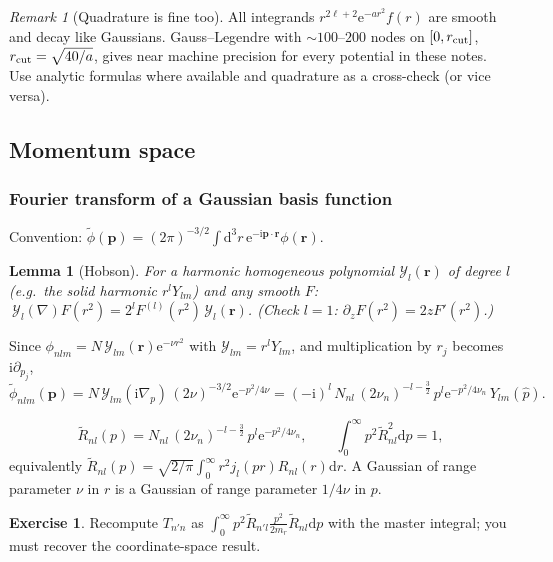 \documentclass[11pt,a4paper]{article}
\numberwithin{equation}{section}
\theoremstyle{definition}
\newtheorem{exercise}[definition]{Exercise}
\theoremstyle{plain}
\newtheorem{lemma}[definition]{Lemma}
\theoremstyle{remark}
\newtheorem{remark}[definition]{Remark}
\newenvironment{keyresult}[1][Key result]{\begin{tcolorbox}[keybox,title={\small\bfseries #1},fonttitle=\small,coltitle=white,colbacktitle=MidnightBlue!70]}{\end{tcolorbox}}
\numberwithin{algorithm}{section}
\newcommand{\vr}{\bm r}
\newcommand{\vp}{\bm p}
\newcommand{\dd}{\mathrm{d}}
\newcommand{\ii}{\mathrm{i}}
\newcommand{\ee}{\mathrm{e}}
\newcommand{\mr}{m_r}
\begin{document}
\begin{remark}[Quadrature is fine too]
All integrands $r^{2\ell+2}\ee^{-ar^2}f(r)$ are smooth and decay like Gaussians. Gauss--Legendre with $\sim100$--$200$ nodes on $[0,r_{\rm cut}]$, $r_{\rm cut}=\sqrt{40/a}$, gives near machine precision for every potential in these notes. Use analytic formulas where available and quadrature as a cross-check (or vice versa).
\end{remark}

\subsection{Momentum space}\label{sec:mom}
\subsubsection{Fourier transform of a Gaussian basis function}
Convention: $\tilde\phi(\vp)=(2\pi)^{-3/2}\int\dd^3r\,\ee^{-\ii\vp\cdot\vr}\phi(\vr)$.
\begin{lemma}[Hobson]
For a harmonic homogeneous polynomial $\mathcal Y_l(\vr)$ of degree $l$ (e.g.\ the solid harmonic $r^lY_{lm}$) and any smooth $F$: $\ \mathcal Y_l(\nabla)F(r^2)=2^lF^{(l)}(r^2)\,\mathcal Y_l(\vr)$. (Check $l=1$: $\partial_zF(r^2)=2zF'(r^2)$.)
\end{lemma}
Since $\phi_{nlm}=N\,\mathcal Y_{lm}(\vr)\ee^{-\nu r^2}$ with $\mathcal Y_{lm}=r^lY_{lm}$, and multiplication by $r_j$ becomes $\ii\partial_{p_j}$,
\begin{equation}
\tilde\phi_{nlm}(\vp)=N\,\mathcal Y_{lm}(\ii\nabla_p)\,(2\nu)^{-3/2}\ee^{-p^2/4\nu}=(-\ii)^l\,N_{nl}\,(2\nu_n)^{-l-\frac32}\,p^l\ee^{-p^2/4\nu_n}\,Y_{lm}(\hat p).
\end{equation}
\begin{keyresult}[Momentum-space radial basis]
\begin{equation}
\tilde R_{nl}(p)=N_{nl}\,(2\nu_n)^{-l-\frac32}\,p^l\ee^{-p^2/4\nu_n},\qquad\int_0^\infty p^2\tilde R_{nl}^2\dd p=1,
\end{equation}
equivalently $\tilde R_{nl}(p)=\sqrt{2/\pi}\int_0^\infty r^2j_l(pr)R_{nl}(r)\dd r$. A Gaussian of range parameter $\nu$ in $r$ is a Gaussian of range parameter $1/4\nu$ in $p$.
\end{keyresult}
\begin{exercise}
Recompute $T_{n'n}$ as $\int_0^\infty p^2\tilde R_{n'l}\frac{p^2}{2\mr}\tilde R_{nl}\dd p$ with the master integral; you must recover the coordinate-space result.
\end{exercise}
\end{document}
